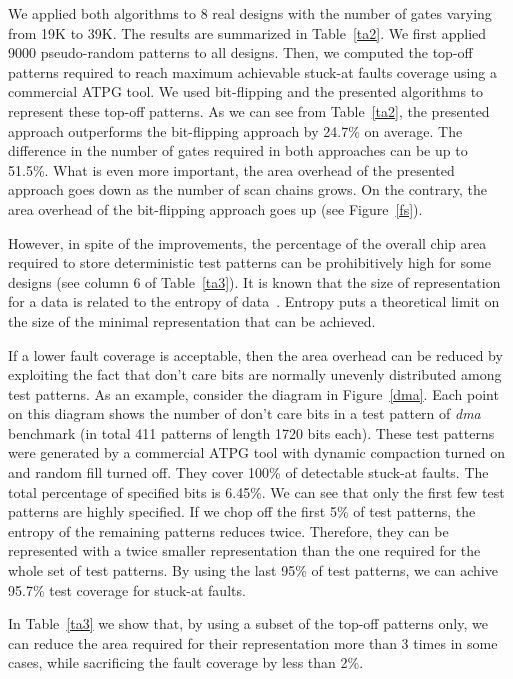 \documentclass[10pt,conference]{IEEEtran}
\begin{document}
We applied both algorithms to 8 real designs with the number of gates varying from
19K to 39K. The results are summarized in Table~\ref{ta2}. We first applied 9000 pseudo-random
patterns to all designs. Then, we computed the top-off patterns required
to reach maximum achievable stuck-at faults coverage using a commercial ATPG tool. 
We used bit-flipping and the presented algorithms to represent 
these top-off patterns. As we can see from  Table~\ref{ta2}, the presented
approach outperforms the bit-flipping approach by 24.7\% on average.
The difference in the number of gates required 
in both approaches can be up to 51.5\%.
What is even more important, the area overhead of the 
presented approach goes down as the number of scan chains grows. 
On the contrary, the area overhead of the bit-flipping approach goes up (see Figure~\ref{fs}).

However, in spite of the improvements,
the percentage of the overall chip area required to store deterministic test 
patterns can be prohibitively high for some designs (see column 6 of Table~\ref{ta3}).
It is known that the size of representation for a data is related to the entropy of data~\cite{Sh48}. 
Entropy puts a theoretical limit on the size of the minimal representation that can be achieved. 




If a lower fault coverage is acceptable, then the area overhead can be 
reduced by exploiting the fact that don't care bits are normally unevenly
distributed among test patterns. As an example, consider the
diagram in Figure~\ref{dma}. Each point on this diagram shows the number of 
don't care bits in a test pattern of {\em dma} benchmark (in total 411 patterns of length 1720 bits each). 
These test patterns were generated by a commercial ATPG tool
with dynamic compaction turned on and random fill turned off.
They cover 100\% of detectable stuck-at faults.
The total percentage of specified bits is 6.45\%.
We can see that only the first few test patterns are highly specified.  
If we chop off the first 5\% of test patterns, the entropy of the remaining patterns
reduces twice. Therefore, they can be represented with 
a twice smaller representation than the one required for the whole set of test patterns.
By using the last 95\% of test patterns, we can achive 95.7\% test coverage for stuck-at faults.

In Table~\ref{ta3} we show that, by using a subset of the top-off patterns only,
we can reduce the area required for their representation more than 3 times in some cases,
while sacrificing the fault coverage by less than 2\%.
\end{document}
